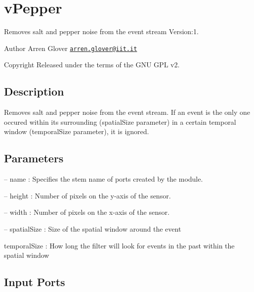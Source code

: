 \hypertarget{group__vPepper}{}\section{v\+Pepper}
\label{group__vPepper}
Removes salt and pepper noise from the event stream Version\+:1. \begin{DoxyAuthor}{Author}
Arren Glover \href{mailto:arren.glover@iit.it}{\tt arren.\+glover@iit.\+it} ~\newline
 
\end{DoxyAuthor}
\begin{DoxyCopyright}{Copyright}
Released under the terms of the G\+NU G\+PL v2. 
\end{DoxyCopyright}
\hypertarget{group__zynqGrabber_intro_sec}{}\subsection{Description}\label{group__zynqGrabber_intro_sec}
Removes salt and pepper noise from the event stream. If an event is the only one occured within its surrounding (spatial\+Size parameter) in a certain temporal window (temporal\+Size parameter), it is ignored.\hypertarget{group__zynqGrabber_parameters_sec}{}\subsection{Parameters}\label{group__zynqGrabber_parameters_sec}

\begin{DoxyItemize}
\item -- name \+: Specifies the stem name of ports created by the module.
\item -- height \+: Number of pixels on the y-\/axis of the sensor.
\item -- width \+: Number of pixels on the x-\/axis of the sensor.
\item -- spatial\+Size \+: Size of the spatial window around the event 

 temporal\+Size \+: How long the filter will look for events in the past within the spatial window 
\end{DoxyItemize}\hypertarget{group__zynqGrabber_inputports_sec}{}\subsection{Input Ports}\label{group__zynqGrabber_inputports_sec}

